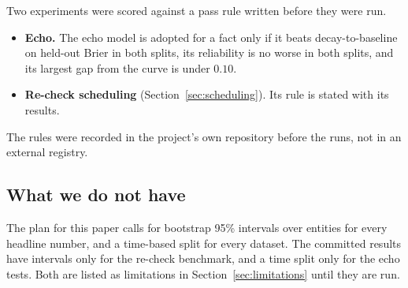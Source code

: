 Two experiments were scored against a pass rule written before they were
run.
\begin{itemize}
  \item \textbf{Echo.} The echo model is adopted for a fact only if it
    beats decay-to-baseline on held-out Brier in both splits, its
    reliability is no worse in both splits, and its largest gap from the
    curve is under $0.10$.
  \item \textbf{Re-check scheduling} (Section~\ref{sec:scheduling}). Its
    rule is stated with its results.
\end{itemize}
The rules were recorded in the project's own repository before the runs,
not in an external registry.

\subsection{What we do not have}

The plan for this paper calls for bootstrap 95\% intervals over entities
for every headline number, and a time-based split for every dataset. The
committed results have intervals only for the re-check benchmark, and a
time split only for the echo tests. Both are listed as limitations in
Section~\ref{sec:limitations} until they are run.
